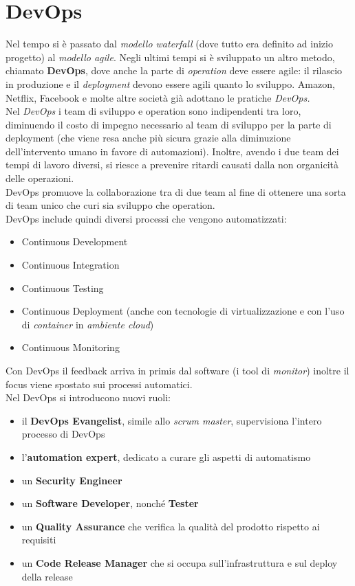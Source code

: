 \documentclass[a4paper,12pt, oneside]{book}
\begin{document}
\chapter{DevOps}
Nel tempo si è passato dal \textit{modello waterfall} (dove tutto era definito
ad inizio progetto) al \textit{modello agile}. Negli ultimi tempi si è
sviluppato un altro metodo, chiamato \textbf{DevOps}, dove anche la parte di
\textit{operation} deve essere agile: il rilascio in produzione e il
\textit{deployment} devono essere agili quanto lo sviluppo. Amazon, Netflix,
Facebook e molte altre società già adottano le pratiche \textit{DevOps.}\\
Nel \textit{DevOps} i team di sviluppo e operation sono indipendenti tra loro,
diminuendo il costo di impegno necessario al team di sviluppo per la parte di
deployment (che viene resa anche più sicura grazie alla diminuzione
dell'intervento umano in favore di automazioni). Inoltre, avendo i due team dei
tempi di lavoro diversi, si riesce a prevenire ritardi causati dalla non
organicità delle operazioni.\\
DevOps promuove la collaborazione tra di due team al fine di ottenere una sorta
di team unico che curi sia sviluppo che operation.\\
DevOps include quindi diversi processi che vengono automatizzati:
\begin{itemize}
  \item Continuous Development
  \item Continuous Integration
  \item Continuous Testing
  \item Continuous Deployment (anche con tecnologie di virtualizzazione e
  con l'uso di \textit{container} in \textit{ambiente cloud})
  \item Continuous Monitoring
\end{itemize}
Con DevOps il feedback arriva in primis dal software (i tool di
\textit{monitor}) inoltre il focus viene spostato sui processi automatici.\\
Nel DevOps si introducono nuovi ruoli:
\begin{itemize}
  \item il \textbf{DevOps Evangelist}, simile allo \textit{scrum master},
  supervisiona l'intero processo di DevOps
  \item l'\textbf{automation expert}, dedicato a curare gli aspetti di
  automatismo 
  \item un \textbf{Security Engineer}
  \item un \textbf{Software Developer}, nonché \textbf{Tester}
  \item un \textbf{Quality Assurance} che verifica la qualità del prodotto
  rispetto ai requisiti
  \item un \textbf{Code Release Manager} che si occupa sull'infrastruttura e
  sul deploy della release
\end{itemize}
\end{document}
